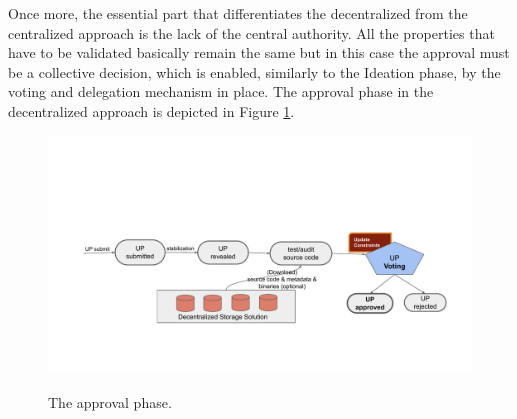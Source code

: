 Once more, the essential part that differentiates the decentralized from the centralized approach is the lack of the central authority. All the properties that have to be validated basically remain the same but in this case the approval must be a collective decision, which is enabled, similarly to the Ideation phase, by the voting and delegation mechanism in place. The approval phase in the decentralized approach is depicted in Figure \ref{approval}.

\begin{figure}[h!] %
    \caption{The approval phase.}
    \centering
    \includegraphics[width=1.0 \columnwidth,keepaspectratio]{figures/approval_phase.pdf}
    \label{approval}
\end{figure}


